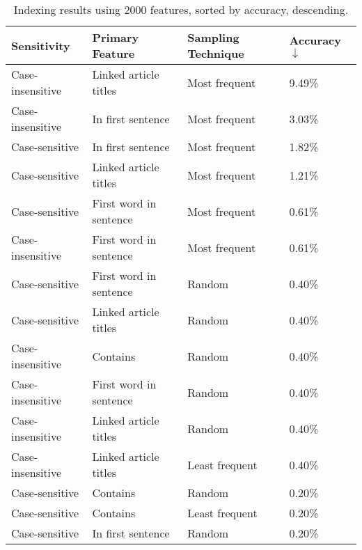 \pagebreak
\begin{center}
\begin{table}[h]
\caption{Indexing results using 2000 features, sorted by accuracy, descending.}
\begin{tabular}{llll}
\label{tab:results-sorted}
\textbf{Sensitivity} & \textbf{Primary Feature}       & \textbf{Sampling Technique} & \textbf{Accuracy $\downarrow$} \\ \hline
Case-insensitive     & Linked article titles  & Most frequent               & 9.49\%             \\ \hline
Case-insensitive     & In first sentence      & Most frequent               & 3.03\%             \\ \hline
Case-sensitive       & In first sentence      & Most frequent               & 1.82\%             \\ \hline
Case-sensitive       & Linked article titles  & Most frequent               & 1.21\%             \\ \hline
Case-sensitive       & First word in sentence & Most frequent               & 0.61\%             \\ \hline
Case-insensitive     & First word in sentence & Most frequent               & 0.61\%             \\ \hline
Case-sensitive       & First word in sentence & Random                      & 0.40\%             \\ \hline
Case-sensitive       & Linked article titles  & Random                      & 0.40\%             \\ \hline
Case-insensitive     & Contains               & Random                      & 0.40\%             \\ \hline
Case-insensitive     & First word in sentence & Random                      & 0.40\%             \\ \hline
Case-insensitive     & Linked article titles  & Random                      & 0.40\%             \\ \hline
Case-insensitive     & Linked article titles  & Least frequent              & 0.40\%             \\ \hline
Case-sensitive       & Contains               & Random                      & 0.20\%             \\ \hline
Case-sensitive       & Contains               & Least frequent              & 0.20\%             \\ \hline
Case-sensitive       & In first sentence      & Random                      & 0.20\%             \\ \hline

\end{tabular}
\end{table}
\end{center}
